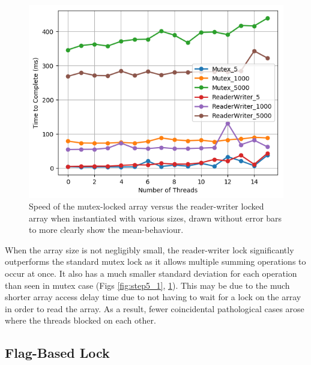 \documentclass[11pt]{article}
\begin{document}
\begin{figure}\label{fig:step5_2}
\centering
\includegraphics[scale=0.65]{step5_2.png}
\caption{Speed of the mutex-locked array versus the reader-writer locked array when instantiated with various sizes, drawn without error bars to more clearly show the mean-behaviour.}
\end{figure}

When the array size is not negligibly small, the reader-writer lock significantly outperforms the standard mutex lock as it allows multiple summing operations to occur at once. It also has a much smaller standard deviation for each operation than seen in mutex case (Figs \ref{fig:step5_1}, \ref{fig:step5_2}). This may be due to the much shorter array access delay time due to not having to wait for a lock on the array in order to read the array. As a result, fewer coincidental pathological cases arose where the threads blocked on each other.

\subsection{Flag-Based Lock}
\end{document}
